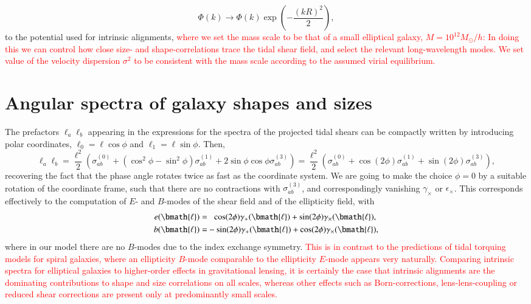 \documentclass[a4paper,fleqn,usenatbib]{mnras}
\newcommand\spirou[1]{\textcolor{red}{#1}}
\newcommand{\vecl}{\bmath{\ell}}
\begin{document}
\begin{equation}
\Phi(k) \rightarrow \Phi(k)\exp\left(-\frac{(kR)^2}{2}\right),
\end{equation}
to the potential used for intrinsic alignments, \spirou{where we set the mass scale to be that of a small elliptical galaxy, $M=10^{12}M_\odot/h$: In doing this we can control how close size- and shape-correlations trace the tidal shear field, and select the relevant long-wavelength modes. We set value of the velocity dispersion $\sigma^2$ to be consistent with the mass scale according to the assumed virial equilibrium.}


\section{Angular spectra of galaxy shapes and sizes}\label{sect_spectra}
The prefactors $\ell_a\ell_b$ appearing in the expressions for the spectra of the projected tidal shears can be compactly written by introducing polar coordinates, $\ell_0 = \ell\cos\phi$ and $\ell_1 = \ell\sin\phi$. Then,
\begin{equation}
\ell_a\ell_b = 
\frac{\ell^2}{2}\left(\sigma^{(0)}_{ab} + (\cos^2\phi-\sin^2\phi)\sigma^{(1)}_{ab} + 2\sin\phi\cos\phi\sigma^{(3)}_{ab}\right) = 
\frac{\ell^2}{2}\left(\sigma^{(0)}_{ab} + \cos(2\phi)\sigma^{(1)}_{ab} + \sin(2\phi)\sigma^{(3)}_{ab}\right),
\end{equation}
recovering the fact that the phase angle rotates twice as fast as the coordinate system. We are going to make the choice $\phi = 0$ by a suitable rotation of the coordinate frame, such that there are no contractions with $\sigma^{(3)}_{ab}$, and correspondingly vanishing $\gamma_\times$ or $\epsilon_\times$. This corresponds effectively to the computation of $E$- and $B$-modes of the shear field and of the ellipticity field, with
\begin{align}
e(\vecl) = &\hphantom{-}\cos(2\phi)\gamma_+(\vecl) + \sin(2\phi)\gamma_\times(\vecl),\\
b(\vecl) = &-\sin(2\phi)\gamma_+(\vecl) + \cos(2\phi)\gamma_\times(\vecl),
\end{align}
where in our model there are no $B$-modes due to the index exchange symmetry. \spirou{This is in contrast to the predictions of tidal torquing models for spiral galaxies, where an ellipticity $B$-mode comparable to the ellipticity $E$-mode appears very naturally. Comparing intrinsic spectra for elliptical galaxies to higher-order effects in gravitational lensing, it is certainly the case that intrinsic alignments are the dominating contributions to shape and size correlations on all scales, whereas other effects such as Born-corrections, lens-lens-coupling or reduced shear corrections are present only at predominantly small scales.}
\end{document}
